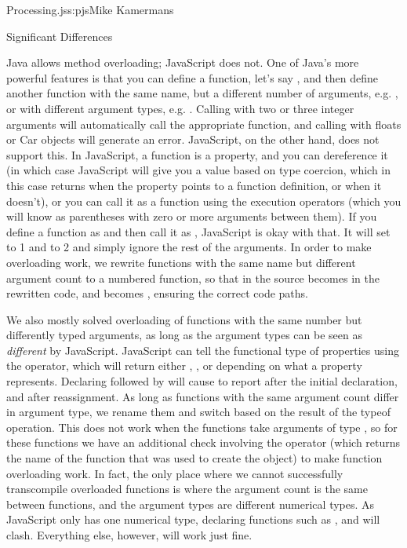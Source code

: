 \begin{aosachapter}{Processing.js}{s:pjs}{Mike Kamermans}
\begin{aosasect1}{Significant Differences}
\begin{aosasect3}{Java allows method overloading; JavaScript does not.}
One of Java's more powerful features is that you can define a
function, let's say , and then define another function
with the same name, but a different number of arguments, e.g. , or with different argument types, e.g. . Calling  with two or three integer arguments will
automatically call the appropriate function, and calling  with
floats or Car objects will generate an error. JavaScript, on the other
hand, does not support this. In JavaScript, a function is a property,
and you can dereference it (in which case JavaScript will give you a
value based on type coercion, which in this case returns  when
the property points to a function definition, or  when it
doesn't), or you can call it as a function using the execution
operators (which you will know as parentheses with zero or more
arguments between them). If you define a function as  and then
call it as , JavaScript is okay with that. It will set 
to 1 and  to 2 and simply ignore the rest of the arguments. In order
to make overloading work, we rewrite functions with the same name but
different argument count to a numbered function, so that
 in the source becomes  in the
rewritten code, and  becomes ,
ensuring the correct code paths.

We also mostly solved overloading of functions with the same number
but differently typed arguments, as long as the argument types can be
seen as \emph{different} by JavaScript. JavaScript can tell the functional
type of properties using the  operator, which will return
either , ,  or  depending on what a
property represents. Declaring  followed by  will
cause  to report  after the initial declaration, and
 after reassignment. As long as functions with the same
argument count differ in argument type, we rename them and switch
based on the result of the typeof operation. This does not work when
the functions take arguments of type , so for these functions
we have an additional check involving the  operator
(which returns the name of the function that was used to create the
object) to make function overloading work. In fact, the only place
where we cannot successfully transcompile overloaded functions is
where the argument count is the same between functions, and the
argument types are different numerical types. As JavaScript only has
one numerical type, declaring functions such as ,
 and  will
clash. Everything else, however, will work just fine.


\end{aosasect3}
\end{aosasect1}
\end{aosachapter}
